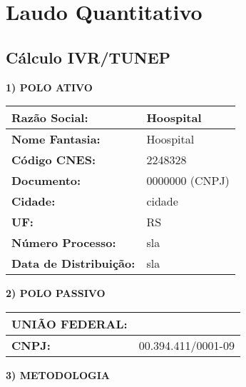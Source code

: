 \documentclass{article}
\begin{document}
    \section*{Laudo Quantitativo}
    \subsection*{Cálculo IVR/TUNEP}

    \textbf{1) POLO ATIVO}

    \begin{tabular}{l l}
    \hline
    \textbf{Razão Social:} & Hoospital \\
    \hline
    \textbf{Nome Fantasia:} & Hoospital \\
    \hline
    \textbf{Código CNES:} & 2248328 \\
    \hline
    \textbf{Documento:} & 0000000 (CNPJ) \\
    \hline
    \textbf{Cidade:} & cidade \\
    \hline
    \textbf{UF:} & RS \\
    \hline
    \textbf{Número Processo:} & sla \\
    \hline
    \textbf{Data de Distribuição:} & sla \\
    \hline
    \end{tabular}

    \vspace{10mm}

    \textbf{2) POLO PASSIVO}

    \begin{tabular}{l l}
    \hline
    \textbf{UNIÃO FEDERAL:} & \\
    \hline
    \textbf{CNPJ:} & 00.394.411/0001-09 \\
    \hline
    \end{tabular}

    \vspace{10mm}

    \textbf{3) METODOLOGIA}
\end{document}
